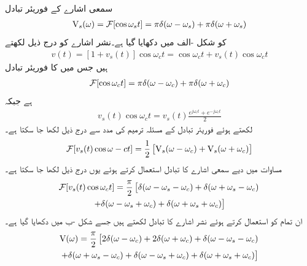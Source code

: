 سمعی اشارے کے فوریئر تبادل
\begin{align}\label{مساوات_فوریئر_سمعی_اشارہ}
{\ensuremath{{\textup{V}}}}_s(\omega)=\mathcal{F}[\cos \omega_s t]=\pi \delta(\omega-\omega_s)+\pi\delta(\omega+\omega_s)
\end{align}
کو شکل -الف میں دکھایا گیا ہے۔نشر اشارے کو درج ذیل لکھتے
\begin{align*}
v(t)=[1+v_s(t)]\cos \omega_c t=\cos \omega_c t+v_s(t) \cos \omega_c t
\end{align*}
ہیں جس میں  کا فوریئر تبادل
\begin{align}
\mathcal{F}[\cos \omega_c t]=\pi \delta(\omega-\omega_c)+\pi\delta(\omega+\omega_c)
\end{align}
ہے جبکہ
\begin{align*}
v_s(t)\cos \omega_c t=v_s(t) \frac{e^{j\omega_c t}+e^{-j\omega_c t}}{2}
\end{align*}
لکھتے ہوئے  فوریئر تبادل کے مسئلہ ترمیم کی مدد سے درج ذیل لکھا جا سکتا ہے۔
\begin{align*}
\mathcal{F}[v_s(t)\cos \omega-c t]=\frac{1}{2}\left[{{\textup{V}}}_s(\omega-\omega_c)+{{\textup{V}}}_s(\omega+\omega_c)\right]
\end{align*}
مساوات  میں دیے سمعی اشارے کا تبادل استعمال کرتے ہوئے یوں درج ذیل لکھا جا سکتا ہے۔
\begin{multline*}
\mathcal{F}[v_s(t)\cos \omega_c t]=\frac{\pi}{2}\left[\delta(\omega-\omega_s-\omega_c)+\delta(\omega+\omega_s-\omega_c)\right.\\
\left.+\delta(\omega-\omega_s+\omega_c)+\delta(\omega+\omega_s+\omega_c)\right]
\end{multline*}
ان تمام کو استعمال کرتے ہوئے نشر اشارے کا تبادل لکھتے ہیں جسے شکل -ب میں دکھایا گیا ہے۔
\begin{multline}
{\ensuremath{{\textup{V}}}}(\omega)=\frac{\pi}{2}\left[2\delta(\omega-\omega_c)+2\delta(\omega+\omega_c)+\delta(\omega-\omega_s-\omega_c)\right.\\
\left.+\delta(\omega+\omega_s-\omega_c)+\delta(\omega-\omega_s+\omega_c)+\delta(\omega+\omega_s+\omega_c)\right]
\end{multline}
%
